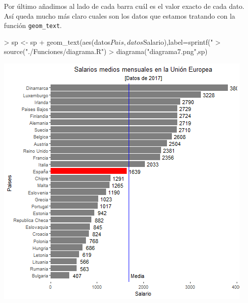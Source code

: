 \documentclass [a4paper] {article}
\begin{document}
\bigskip
Por último añadimos al lado de cada barra cuál es el valor exacto de cada dato. Así queda mucho más claro cuales
son los datos que estamos tratando con la función \texttt{geom\_text}.
\begin{Schunk}
\begin{Sinput}
> sp <- sp + geom_text(aes(datos$Pais,datos$Salario),label=sprintf("           %
> source("./Funciones/diagrama.R")
> diagrama("diagrama7.png",sp)
\end{Sinput}
\end{Schunk}

\includegraphics[width=\textwidth]{diagrama7}
\end{document}
